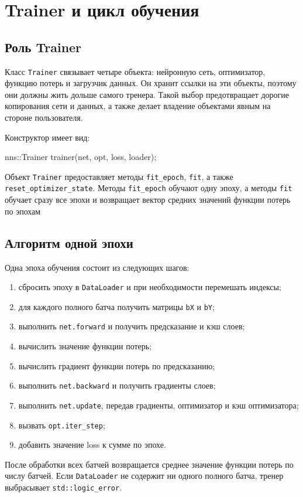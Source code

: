 \documentclass{article}
\begin{document}
\section{Trainer и цикл обучения}

\subsection{Роль Trainer}

Класс \texttt{Trainer} связывает четыре объекта: нейронную сеть,
оптимизатор, функцию потерь и загрузчик данных. Он хранит ссылки на
эти объекты, поэтому они должны жить дольше самого тренера. Такой
выбор предотвращает дорогие копирования сети и данных, а также делает
владение объектами явным на стороне пользователя.

Конструктор имеет вид:
\begin{cppcode}
nns::Trainer trainer(net, opt, loss, loader);
\end{cppcode}
Объект \texttt{Trainer} предоставляет методы \texttt{fit\_epoch},
\texttt{fit}, а также \texttt{reset\_optimizer\_state}. Методы
\texttt{fit\_epoch} обучают одну эпоху, а методы \texttt{fit} обучает сразу все эпохи
и возвращает вектор средних значений функции потерь по эпохам

\subsection{Алгоритм одной эпохи}

Одна эпоха обучения состоит из следующих шагов:
\begin{enumerate}
    \item сбросить эпоху в \texttt{DataLoader} и при необходимости
        перемешать индексы; \item для каждого полного батча получить
        матрицы \texttt{bX} и \texttt{bY}; \item выполнить
        \texttt{net.forward} и получить предсказание и кэш слоев;
        \item вычислить значение функции потерь; \item вычислить
        градиент функции потерь по предсказанию; \item выполнить
        \texttt{net.backward} и получить градиенты слоев; \item
        выполнить \texttt{net.update}, передав градиенты, оптимизатор
        и кэш оптимизатора; \item вызвать \texttt{opt.iter\_step};
        \item добавить значение loss к сумме по эпохе.
\end{enumerate}
После обработки всех батчей возвращается среднее значение функции
потерь по числу батчей. Если \texttt{DataLoader} не содержит ни одного
полного батча, тренер выбрасывает \texttt{std::logic\_error}.
\end{document}
